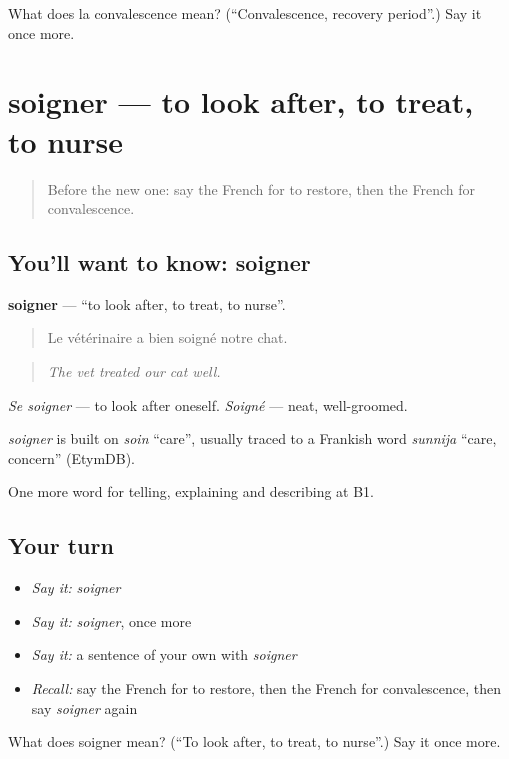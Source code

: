 \begin{tcolorbox}[breakable,colback=teal!4,colframe=teal!35!black,title={Before you move on}]
What does la convalescence mean? (\textquotedblleft{}Convalescence, recovery period\textquotedblright{}.) Say it once more.
\end{tcolorbox}
\section[soigner]{soigner — to look after, to treat, to nurse}

\label{lesson:FR-C485-soigner}



\begin{quote}
Before the new one: say the French for to restore, then the French for convalescence.
\end{quote}

\subsection*{You'll want to know: soigner}
\textbf{soigner} — \textquotedblleft{}to look after, to treat, to nurse\textquotedblright{}.

\begin{quote}
Le vétérinaire a bien soigné notre chat.
\end{quote}

\begin{quote}
\emph{The vet treated our cat well.}
\end{quote}

\emph{Se soigner} — to look after oneself. \emph{Soigné} — neat, well-groomed.

\begin{cousinweb}
\emph{soigner} is built on \emph{soin} \textquotedblleft{}care\textquotedblright{}, usually traced to a Frankish word \emph{sunnija} \textquotedblleft{}care, concern\textquotedblright{} (EtymDB).
\end{cousinweb}

\begin{grammarlens}[title={What you've built}]
One more word for telling, explaining and describing at B1.
\end{grammarlens}

\subsection*{Your turn}
\begin{itemize}
\raggedright
  \item \emph{Say it:} \emph{soigner}
  \item \emph{Say it:} \emph{soigner}, once more
  \item \emph{Say it:} a sentence of your own with \emph{soigner}
  \item \emph{Recall:} say the French for to restore, then the French for convalescence, then say \emph{soigner} again
\end{itemize}

\begin{tcolorbox}[breakable,colback=teal!4,colframe=teal!35!black,title={Before you move on}]
What does soigner mean? (\textquotedblleft{}To look after, to treat, to nurse\textquotedblright{}.) Say it once more.
\end{tcolorbox}
